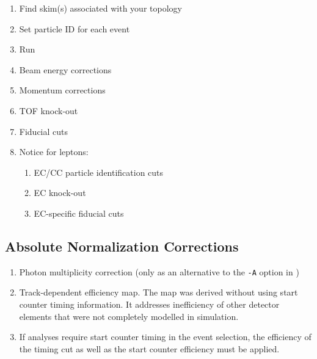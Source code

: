 \documentclass[10pt,twocolumn,oneside,letterpaper]{article}
\begin{document}
\begin{enumerate}
    \item Find skim(s) associated with your topology
    \item Set particle ID for each event
    \item Run 
    \item Beam energy corrections
    \item Momentum corrections
    \item TOF knock-out
    \item Fiducial cuts
    \item Notice for leptons:
    \begin{enumerate}
        \item EC/CC particle identification cuts
        \item EC knock-out
        \item EC-specific fiducial cuts
    \end{enumerate}
\end{enumerate}

\subsection{Absolute Normalization Corrections}

\begin{enumerate}
    \item Photon multiplicity correction (only as an alternative to the \verb|-A| option in )
    \item Track-dependent efficiency map. The map was derived without using start counter timing information. It addresses inefficiency of other detector elements that were not completely modelled in simulation.
    \item If analyses require start counter timing in the event selection, the efficiency of the timing cut as well as the start counter efficiency must be applied.
\end{enumerate}
\end{document}
